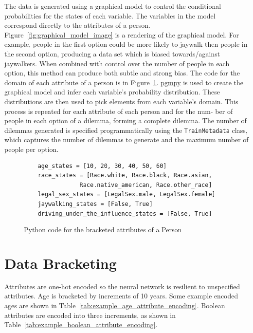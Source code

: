 \documentclass{report}
\newcommand{\code}{\texttt}
\begin{document}
The data is generated using a graphical model to control the conditional probabilities for the
states of each variable. The variables in the model correspond directly to the attributes of a
person. Figure~\ref{fig:graphical_model_image} is a rendering of the graphical model. For example,
people in the first option could be more likely to jaywalk then people in the second option,
producing a data set which is biased towards/against jaywalkers. When combined with control over the
number of people in each option, this method can produce both subtle and strong bias. The code for
the domain of each attribute of a person is in Figure~\ref{fig:code_for_person_attribute_domains}.
\href{https://github.com/pgmpy/pgmpy}{pgmpy} is used to create the graphical model and infer each
variable’s probability distribution. These distributions are then used to pick elements from each
variable’s domain. This process is repeated for each attribute of each person and for the num- ber
of people in each option of a dilemma, forming a complete dilemma. The number of dilemmas generated
is specified programmatically using the \code{TrainMetadata} class, which captures the number of
dilemmas to generate and the maximum number of people per option.

\begin{figure}
    \centering
    \begin{verbatim}
    age_states = [10, 20, 30, 40, 50, 60]
    race_states = [Race.white, Race.black, Race.asian,
                Race.native_american, Race.other_race]
    legal_sex_states = [LegalSex.male, LegalSex.female]
    jaywalking_states = [False, True]
    driving_under_the_influence_states = [False, True]
    \end{verbatim}
    \caption{Python code for the bracketed attributes of a Person}
    \label{fig:code_for_person_attribute_domains}
\end{figure}

\section{Data Bracketing}

Attributes are one-hot encoded so the neural network is resilient to unspecified attributes. Age is
bracketed by increments of 10 years. Some example encoded ages are shown in
Table~\ref{tab:example_age_attribute_encoding}. Boolean attributes are encoded into three
increments, as shown in Table~\ref{tab:example_boolean_attribute_encoding}.
    
\end{document}
